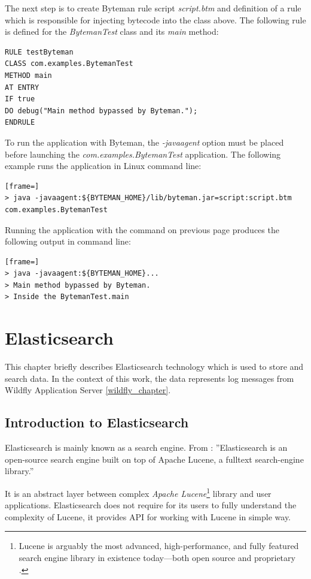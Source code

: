 \documentclass[12pt,oneside]{fithesis2}
\begin{document}
The next step is to create Byteman rule script \textit{script.btm} and definition of a rule which is responsible for injecting bytecode into the class above. The following rule is defined for the \textit{BytemanTest} class and its \textit{main} method:
\begin{lstlisting}[caption = Example of Byteman rule, label = rule_use_case, style=byteman]
RULE testByteman
CLASS com.examples.BytemanTest
METHOD main
AT ENTRY
IF true
DO debug("Main method bypassed by Byteman.");
ENDRULE
\end{lstlisting}
To run the application with Byteman, the \textit{-javaagent} option must be placed before launching the \textit{com.examples.BytemanTest} application. The following example runs the application in Linux command line:
\begin{lstlisting}[frame=]
> java -javaagent:${BYTEMAN_HOME}/lib/byteman.jar=script:script.btm com.examples.BytemanTest
\end{lstlisting}

\newpage
Running the application with the command on previous page produces the following output in command line:
\begin{lstlisting}[frame=]
> java -javaagent:${BYTEMAN_HOME}...
> Main method bypassed by Byteman.
> Inside the BytemanTest.main
\end{lstlisting}

\chapter{Elasticsearch}
\label{elasticsearch_chap}
This chapter briefly describes Elasticsearch technology which is used to store and search data. In the context of this work, the data represents log messages from Wildfly Application Server \ref{wildfly_chapter}.

\section{Introduction to Elasticsearch}
Elasticsearch is mainly known as a search engine. From \cite{elasticsearch_defnitive_guide}: ''Elasticsearch is an open-source search engine built on top of Apache Lucene, a fulltext search-engine library.''

It is an abstract layer between complex \textit{Apache Lucene}\footnote{Lucene is arguably the most advanced, high-performance, and fully featured search engine library in existence today—both open source and proprietary \cite{elasticsearch_defnitive_guide}.} library and user applications. Elasticsearch does not require for its users to fully understand the complexity of Lucene, it provides API for working with Lucene in simple way.
\end{document}
